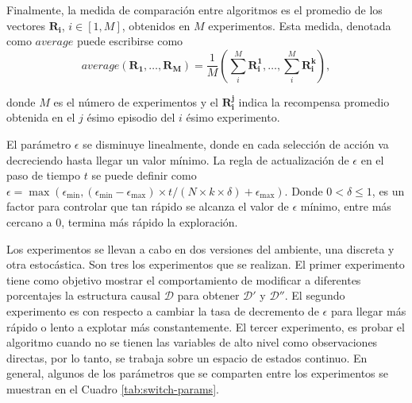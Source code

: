 Finalmente, la medida de comparación entre algoritmos es
el promedio de los vectores $\mathbf{R_i}$, $i\in [1, M]$,  obtenidos en $M$ experimentos. Esta medida, denotada como  $average$ puede escribirse como 
\begin{equation}
\label{eq:average}
average(\mathbf{R_1}, \dots, \mathbf{R_M}) = \frac{1}{M}(\sum^M_i \mathbf{R_{i}^1}, \dots, \sum^M_i\mathbf{R_{i}^k}),    
\end{equation}

donde $M$ es el número de experimentos y el $\mathbf{R_i^j}$ indica la recompensa promedio obtenida en el $j$ ésimo episodio del $i$ ésimo experimento.

El parámetro $\epsilon$ se disminuye linealmente, donde
en cada selección de acción va decreciendo hasta llegar
un valor mínimo. La regla de actualización de $\epsilon$ en
el paso de tiempo $t$ se puede definir como $\epsilon = \max(\epsilon_{\min}, (\epsilon_{\min} - \epsilon_{\max}) \times t/ (N \times k \times \delta) + \epsilon_{\max})$. Donde $0 < \delta \leq 1$, es un factor para controlar
que tan rápido se alcanza el valor de $\epsilon$  mínimo, entre más cercano a 0,
termina más rápido la exploración.

Los experimentos se llevan a cabo en dos versiones del ambiente, una discreta y otra estocástica. Son tres los experimentos que se realizan. El primer experimento tiene 
como objetivo mostrar el comportamiento de modificar a
diferentes porcentajes la estructura causal $\mathcal{D}$ para obtener $\mathcal{D'}$ y $\mathcal{D}''$. El segundo experimento es con respecto a cambiar la tasa de decremento
de $\epsilon$ para llegar más rápido o lento a explotar 
más constantemente. El tercer experimento, es probar
el algoritmo cuando no se tienen las variables
de alto nivel como observaciones directas, por lo tanto,
se trabaja sobre un espacio de estados continuo. En general,
algunos de los parámetros que se comparten entre los experimentos se muestran en el Cuadro \ref{tab:switch-params}.

